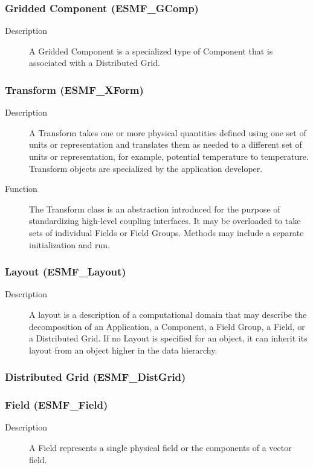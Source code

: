 \subsubsection{Gridded Component (ESMF\_GComp)} 
\label{sec:gridcomp}
\begin{description}
\item [Description] A Gridded Component is a specialized type of Component that is associated
with a Distributed Grid.  
\end{description}

\subsubsection{Transform (ESMF\_XForm)} 
\begin{description}
\item [Description] A Transform takes one or more physical quantities defined using one set 
of units or representation
and translates them as needed to a different set of units or representation, for example, 
potential temperature
to temperature.  Transform objects are specialized by the application developer.
\item [Function] The Transform class is an abstraction introduced for the
purpose of standardizing high-level coupling interfaces.  It may be overloaded
to take sets of individual Fields or Field Groups.  Methods may include a
separate initialization and run. 
\end{description}

\subsubsection{Layout (ESMF\_Layout)}
\label{sec:layout} 
\begin{description}
\item [Description] A layout is a description of a computational domain that
may describe the decomposition of an Application, a Component, a Field Group, a Field, or 
a Distributed Grid.
If no Layout is specified for an object, it can inherit its layout from an object
higher in the data hierarchy.  
\end{description}

\subsubsection{Distributed Grid (ESMF\_DistGrid)} 

\subsubsection{Field (ESMF\_Field)}
\begin{description} 
\item [Description] A Field represents a single physical field or the components of a 
vector field.  
\end{description}

